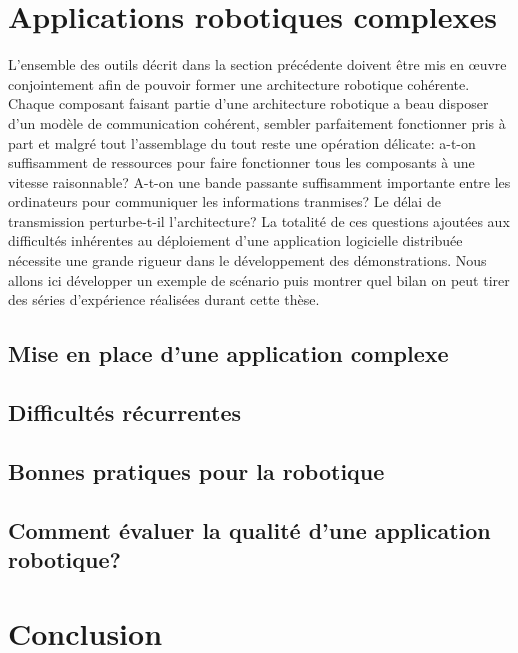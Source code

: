 \section{Applications robotiques complexes}


L'ensemble des outils décrit dans la section précédente doivent être
mis en \oe uvre conjointement afin de pouvoir former une architecture
robotique cohérente. Chaque composant faisant partie d'une
architecture robotique a beau disposer d'un modèle de communication
cohérent, sembler parfaitement fonctionner pris à part et malgré tout
l'assemblage du tout reste une opération délicate: a-t-on suffisamment
de ressources pour faire fonctionner tous les composants à une vitesse
raisonnable? A-t-on une bande passante suffisamment importante entre
les ordinateurs pour communiquer les informations tranmises? Le délai
de transmission perturbe-t-il l'architecture? La totalité de ces
questions ajoutées aux difficultés inhérentes au déploiement d'une
application logicielle distribuée nécessite une grande rigueur dans le
développement des démonstrations. Nous allons ici développer un
exemple de scénario puis montrer quel bilan on peut tirer des séries
d'expérience réalisées durant cette thèse.


\subsection{Mise en place d'une application complexe}

\subsection{Difficultés récurrentes}

\subsection{Bonnes pratiques pour la robotique}

\subsection{Comment évaluer la qualité d'une application robotique?}


\section{Conclusion}


